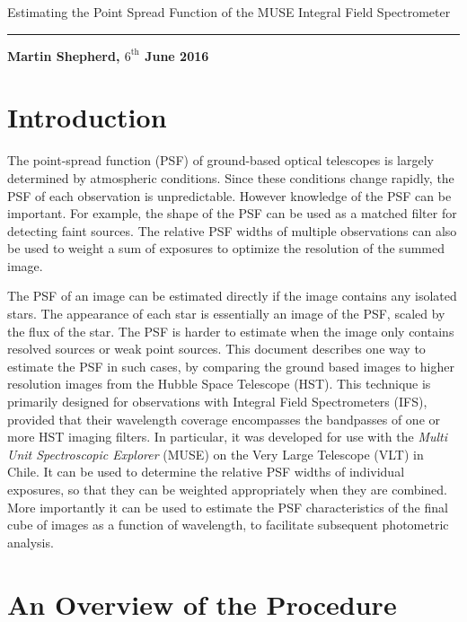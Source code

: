 \documentclass[12pt,twoside,a4paper]{article}
\begin{document}
\vspace{1in}
\begin{center}
{\LARGE\sf Estimating the Point Spread Function of the MUSE Integral
  Field Spectrometer}
\end{center}

\hrule

{\small\bf Martin Shepherd,  $6^{\mbox{th}}$ June 2016}\\

\section{Introduction}

The point-spread function (PSF) of ground-based optical telescopes is
largely determined by atmospheric conditions. Since these conditions
change rapidly, the PSF of each observation is unpredictable.  However
knowledge of the PSF can be important. For example, the shape of the
PSF can be used as a matched filter for detecting faint sources. The
relative PSF widths of multiple observations can also be used to
weight a sum of exposures to optimize the resolution of the summed
image.

The PSF of an image can be estimated directly if the image contains
any isolated stars. The appearance of each star is essentially an
image of the PSF, scaled by the flux of the star. The PSF is harder to
estimate when the image only contains resolved sources or weak point
sources. This document describes one way to estimate the PSF in such
cases, by comparing the ground based images to higher resolution
images from the Hubble Space Telescope (HST). This technique is
primarily designed for observations with Integral Field Spectrometers
(IFS), provided that their wavelength coverage encompasses the
bandpasses of one or more HST imaging filters. In particular, it was
developed for use with the \textit{Multi Unit Spectroscopic Explorer}
(MUSE) on the Very Large Telescope (VLT) in Chile.  It can be used to
determine the relative PSF widths of individual exposures, so that
they can be weighted appropriately when they are combined. More
importantly it can be used to estimate the PSF characteristics of the
final cube of images as a function of wavelength, to facilitate
subsequent photometric analysis.

\section{An Overview of the Procedure}
\end{document}
